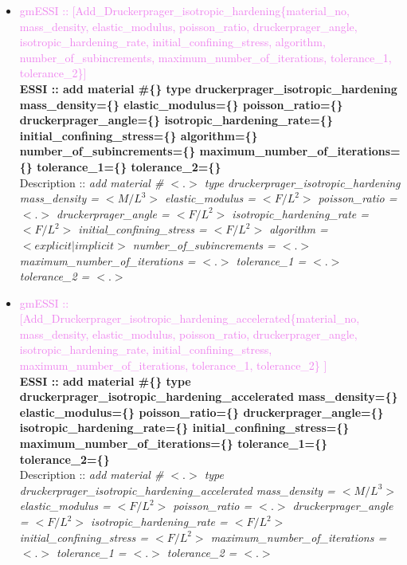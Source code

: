 \documentclass[11pt]{article}
\begin{document}
\begin{itemize}
      \item \textcolor{violet}{gmESSI :: [Add\_Druckerprager\_isotropic\_hardening\{material\_no, mass\_density, elastic\_modulus, poisson\_ratio, druckerprager\_angle, isotropic\_hardening\_rate, initial\_confining\_stress, algorithm, number\_of\_subincrements, maximum\_number\_of\_iterations, tolerance\_1, tolerance\_2\}]}\\                                                                                                                 
      \textbf{ESSI :: add material \#\{\} type druckerprager\_isotropic\_hardening mass\_density=\{\} elastic\_modulus=\{\}  poisson\_ratio=\{\} druckerprager\_angle=\{\} isotropic\_hardening\_rate=\{\} initial\_confining\_stress=\{\} algorithm=\{\}  number\_of\_subincrements=\{\} maximum\_number\_of\_iterations=\{\} tolerance\_1=\{\} tolerance\_2=\{\} }\\
      Description ::  \textit{ add material \# $<.>$ type druckerprager\_isotropic\_hardening mass\_density = $<M/L^3>$ elastic\_modulus = $<F/L^2>$  poisson\_ratio = $<.>$ druckerprager\_angle = $<F/L^2>$ isotropic\_hardening\_rate = $<F/L^2>$ initial\_confining\_stress = $<F/L^2>$ algorithm = $<explicit|implicit>$  number\_of\_subincrements = $<.>$ maximum\_number\_of\_iterations = $<.>$ tolerance\_1 = $<.>$ tolerance\_2 = $<.>$} 

      \item \textcolor{violet}{gmESSI :: [Add\_Druckerprager\_isotropic\_hardening\_accelerated\{material\_no, mass\_density, elastic\_modulus, poisson\_ratio, druckerprager\_angle, isotropic\_hardening\_rate, initial\_confining\_stress, maximum\_number\_of\_iterations, tolerance\_1, tolerance\_2\} ]}\\
      \textbf{ESSI :: add material \#\{\} type druckerprager\_isotropic\_hardening\_accelerated mass\_density=\{\} elastic\_modulus=\{\}  poisson\_ratio=\{\} druckerprager\_angle=\{\} isotropic\_hardening\_rate=\{\} initial\_confining\_stress=\{\} maximum\_number\_of\_iterations=\{\} tolerance\_1=\{\} tolerance\_2=\{\} }\\
      Description ::  \textit{ add material \# $<.>$ type druckerprager\_isotropic\_hardening\_accelerated mass\_density = $<M/L^3>$ elastic\_modulus = $<F/L^2>$  poisson\_ratio = $<.>$ druckerprager\_angle = $<F/L^2>$ isotropic\_hardening\_rate = $<F/L^2>$ initial\_confining\_stress = $<F/L^2>$ maximum\_number\_of\_iterations = $<.>$ tolerance\_1 = $<.>$ tolerance\_2 = $<.>$} 


\end{itemize}
\end{document}
